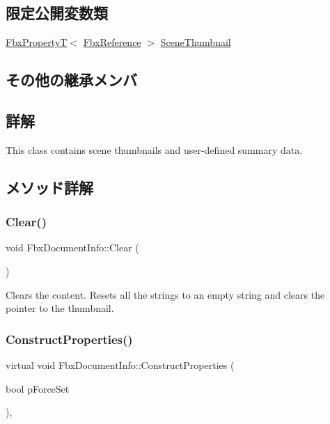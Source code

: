 \subsection*{限定公開変数類}
\begin{DoxyCompactItemize}
\item 
\hyperlink{class_fbx_property_t}{Fbx\+PropertyT}$<$ \hyperlink{fbxtypes_8h_a44df6a2eec915cf27cd481e5c5e48a24}{Fbx\+Reference} $>$ \hyperlink{class_fbx_document_info_ab8e6240d40fbc0aa51f72aca4f3b9042}{Scene\+Thumbnail}
\end{DoxyCompactItemize}
\subsection*{その他の継承メンバ}


\subsection{詳解}
This class contains scene thumbnails and user-\/defined summary data. 

\subsection{メソッド詳解}
\mbox{\label{class_fbx_document_info_a6a372ab1bf0c0e5452230a42c21f0d23}} 
\subsubsection{\texorpdfstring{Clear()}{Clear()}}
{\footnotesize\ttfamily void Fbx\+Document\+Info\+::\+Clear (\begin{DoxyParamCaption}{ }\end{DoxyParamCaption})}

Clears the content. Resets all the strings to an empty string and clears the pointer to the thumbnail. \mbox{\label{class_fbx_document_info_ae66f4663bce15c6e9c60184764066983}} 
\subsubsection{\texorpdfstring{Construct\+Properties()}{ConstructProperties()}}
{\footnotesize\ttfamily virtual void Fbx\+Document\+Info\+::\+Construct\+Properties (\begin{DoxyParamCaption}\item[{bool}]{p\+Force\+Set }\end{DoxyParamCaption})\hspace{0.3cm}{\ttfamily [protected]}, {\ttfamily [virtual]}}


